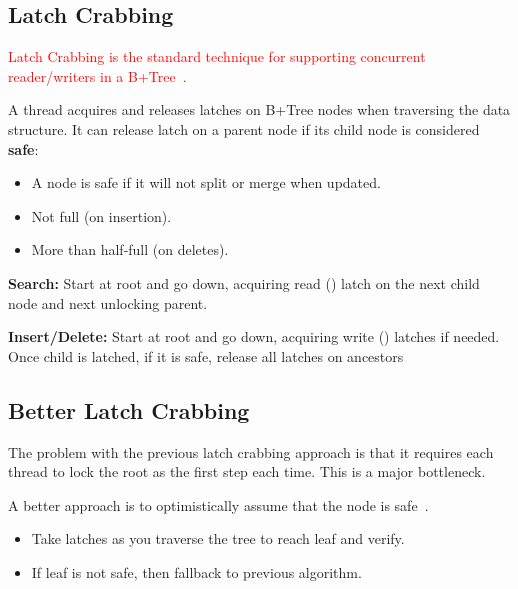\documentclass[11pt]{article}
\newcommand{\rr}[1]{\textcolor{red}{#1}}
\begin{document}
\subsection*{Latch Crabbing}
\rr{Latch Crabbing is the standard technique for supporting concurrent reader/writers in a B+Tree~\cite{a1-bayer}.}

A thread acquires and releases latches on B+Tree nodes when traversing the data structure. It can release latch on a parent node if its child node is considered \textbf{safe}:
    \begin{itemize}
        \item
        A node is safe if it will not split or merge when updated.
        
        \item
        Not full (on insertion).
        
        \item
        More than half-full (on deletes).
    \end{itemize}

\textbf{Search:}
Start at root and go down, acquiring read () latch on the next child node and next unlocking parent.

\textbf{Insert/Delete:}
Start at root and go down, acquiring write () latches if 
needed. Once child is latched, if it is safe, release all latches on ancestors

\subsection*{Better Latch Crabbing}
The problem with the previous latch crabbing approach is that it requires each thread to lock the 
root as the first step each time. This is a major bottleneck.

A better approach is to optimistically assume that the node is safe~\cite{a1-bayer}.
\begin{itemize}
    \item
    Take  latches as you traverse the tree to reach leaf and verify.
    
    \item
    If leaf is not safe, then fallback to previous algorithm.
\end{itemize}
\end{document}
